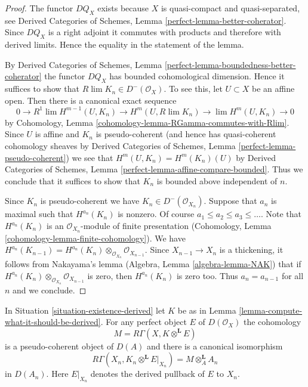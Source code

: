 \begin{proof}
The functor $DQ_X$ exists because $X$ is quasi-compact and
quasi-separated, see Derived Categories of Schemes, Lemma
\ref{perfect-lemma-better-coherator}.
Since $DQ_X$ is a right adjoint it commutes with products
and therefore with derived limits. Hence the equality
in the statement of the lemma.

\medskip\noindent
By Derived Categories of Schemes,
Lemma \ref{perfect-lemma-boundedness-better-coherator}
the functor $DQ_X$ has bounded cohomological dimension.
Hence it suffices to show that $R\lim K_n \in D^-(\mathcal{O}_X)$.
To see this, let $U \subset X$ be an affine open.
Then there is a canonical exact sequence
$$
0 \to
R^1\lim H^{m - 1}(U, K_n) \to H^m(U, R\lim K_n) \to
\lim H^m(U, K_n) \to 0
$$
by Cohomology, Lemma \ref{cohomology-lemma-RGamma-commutes-with-Rlim}.
Since $U$ is affine and $K_n$ is pseudo-coherent (and hence has
quasi-coherent cohomology sheaves by
Derived Categories of Schemes, Lemma \ref{perfect-lemma-pseudo-coherent})
we see that $H^m(U, K_n) = H^m(K_n)(U)$ by
Derived Categories of Schemes, Lemma
\ref{perfect-lemma-affine-compare-bounded}.
Thus we conclude that it suffices to show that $K_n$
is bounded above independent of $n$.

\medskip\noindent
Since $K_n$ is pseudo-coherent we have $K_n \in D^-(\mathcal{O}_{X_n})$.
Suppose that $a_n$ is maximal such that $H^{a_n}(K_n)$ is nonzero.
Of course $a_1 \leq a_2 \leq a_3 \leq \ldots$.
Note that $H^{a_n}(K_n)$ is an
$\mathcal{O}_{X_n}$-module of finite presentation
(Cohomology, Lemma \ref{cohomology-lemma-finite-cohomology}).
We have $H^{a_n}(K_{n - 1}) =
H^{a_n}(K_n) \otimes_{\mathcal{O}_{X_n}} \mathcal{O}_{X_{n - 1}}$.
Since $X_{n - 1} \to X_n$ is a thickening, it follows from
Nakayama's lemma (Algebra, Lemma \ref{algebra-lemma-NAK}) that if
$H^{a_n}(K_n) \otimes_{\mathcal{O}_{X_n}} \mathcal{O}_{X_{n - 1}}$
is zero, then $H^{a_n}(K_n)$ is zero too. Thus $a_n = a_{n - 1}$
for all $n$ and we conclude.
\end{proof}

\begin{lemma}
\label{lemma-compute-against-perfect-derived}
In Situation \ref{situation-existence-derived} let $K$ be as in
Lemma \ref{lemma-compute-what-it-should-be-derived}. For any perfect
object $E$ of $D(\mathcal{O}_X)$ the cohomology
$$
M = R\Gamma(X, K \otimes^\mathbf{L} E)
$$
is a pseudo-coherent object of $D(A)$ and there is a canonical isomorphism
$$
R\Gamma(X_n, K_n \otimes^\mathbf{L} E|_{X_n}) = M \otimes_A^\mathbf{L} A_n
$$
in $D(A_n)$. Here $E|_{X_n}$ denotes the derived pullback of $E$ to $X_n$.
\end{lemma}

